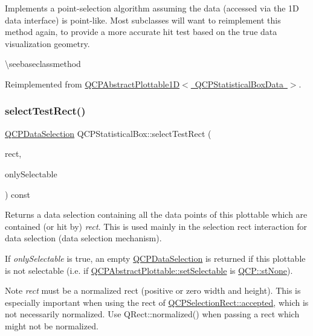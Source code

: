 Implements a point-\/selection algorithm assuming the data (accessed via the 1D data interface) is point-\/like. Most subclasses will want to reimplement this method again, to provide a more accurate hit test based on the true data visualization geometry.

\textbackslash{}seebaseclassmethod 

Reimplemented from \mbox{\hyperlink{class_q_c_p_abstract_plottable1_d_a4611b43bcb6441b2154eb4f4e0a33db2}{Q\+C\+P\+Abstract\+Plottable1\+D$<$ Q\+C\+P\+Statistical\+Box\+Data $>$}}.

\mbox{\label{class_q_c_p_statistical_box_a42febad6ad5e924a151434cc434b4ffc}} 
\subsubsection{\texorpdfstring{selectTestRect()}{selectTestRect()}}
{\footnotesize\ttfamily \mbox{\hyperlink{class_q_c_p_data_selection}{Q\+C\+P\+Data\+Selection}} Q\+C\+P\+Statistical\+Box\+::select\+Test\+Rect (\begin{DoxyParamCaption}\item[{const Q\+RectF \&}]{rect,  }\item[{bool}]{only\+Selectable }\end{DoxyParamCaption}) const\hspace{0.3cm}{\ttfamily [virtual]}}





Returns a data selection containing all the data points of this plottable which are contained (or hit by) {\itshape rect}. This is used mainly in the selection rect interaction for data selection (data selection mechanism).

If {\itshape only\+Selectable} is true, an empty \mbox{\hyperlink{class_q_c_p_data_selection}{Q\+C\+P\+Data\+Selection}} is returned if this plottable is not selectable (i.\+e. if \mbox{\hyperlink{class_q_c_p_abstract_plottable_ac238d6e910f976f1f30d41c2bca44ac3}{Q\+C\+P\+Abstract\+Plottable\+::set\+Selectable}} is \mbox{\hyperlink{namespace_q_c_p_ac6cb9db26a564b27feda362a438db038aa64628e338a2dd1e6f0dc84dec0b63fe}{Q\+C\+P\+::st\+None}}).

\begin{DoxyNote}{Note}
{\itshape rect} must be a normalized rect (positive or zero width and height). This is especially important when using the rect of \mbox{\hyperlink{class_q_c_p_selection_rect_a15a43542e1f7b953a44c260b419e6d2c}{Q\+C\+P\+Selection\+Rect\+::accepted}}, which is not necessarily normalized. Use {\ttfamily Q\+Rect\+::normalized()} when passing a rect which might not be normalized. 
\end{DoxyNote}


